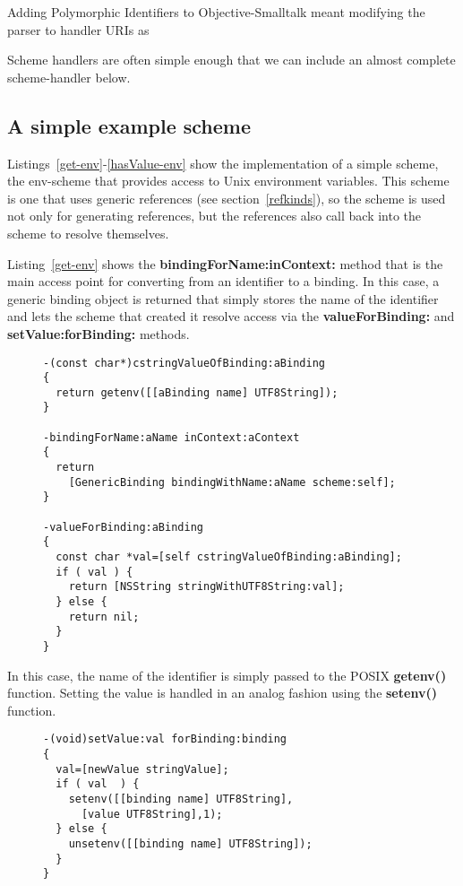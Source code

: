 \documentclass[preprint,authoryear]{llncs}
\begin{document}
Adding Polymorphic Identifiers to Objective-Smalltalk meant modifying the parser to handler URIs as 

Scheme handlers are often simple enough that we can include an almost complete scheme-handler below.

\subsection{A simple example scheme}

Listings~\ref{get-env}-\ref{hasValue-env} show the implementation of a simple scheme,
the env-scheme that provides access to Unix environment variables.  This scheme is
one that uses generic references (see section~\ref{refkinds}), so the scheme is used
not only for generating references, but the references also call back into the scheme
to resolve themselves.

Listing~\ref{get-env} 
shows the {\bf bindingForName:inContext:} method that is the main access point for
converting from an identifier to a binding.  In this case, a generic binding object is returned
that simply stores the name of the identifier and lets the scheme that created it resolve
access via the {\bf valueForBinding:} and {\bf setValue:forBinding:} methods.


\begin{figure}[htbp]
\begin{lstlisting}[style=L,label=get-env,caption=Basic lookup in env: scheme.]
-(const char*)cstringValueOfBinding:aBinding
{
  return getenv([[aBinding name] UTF8String]);
}

-bindingForName:aName inContext:aContext
{
  return
    [GenericBinding bindingWithName:aName scheme:self];
}

-valueForBinding:aBinding
{
  const char *val=[self cstringValueOfBinding:aBinding];
  if ( val ) {
    return [NSString stringWithUTF8String:val];
  } else {
    return nil;
  }
}
\end{lstlisting}
\end{figure}

In this case, the name of the identifier is simply passed to the POSIX {\bf getenv()} function.
Setting the value is handled in an analog fashion using the {\bf setenv()} function.


\begin{figure}[htbp]
\begin{lstlisting}[style=L,label=setvalue-env,caption=Set value in env: scheme.]
-(void)setValue:val forBinding:binding
{
  val=[newValue stringValue];
  if ( val  ) {
    setenv([[binding name] UTF8String],
      [value UTF8String],1);
  } else {
    unsetenv([[binding name] UTF8String]);
  }
}
\end{lstlisting}
\end{figure}
\end{document}
